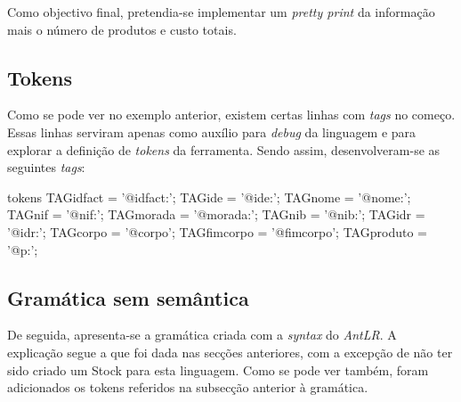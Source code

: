 \documentclass[11pt,a4paper]{article}
\begin{document}
Como objectivo final, pretendia-se implementar um \emph{pretty print} da informação mais o número de produtos e custo totais. 

\subsection{Tokens}

Como se pode ver no exemplo anterior, existem certas linhas com \emph{tags} no começo. Essas linhas serviram apenas como auxílio para \emph{debug} da 
linguagem e para explorar a definição de \emph{tokens} da ferramenta. Sendo assim, desenvolveram-se as seguintes \emph{tags}:

\begin{code_txt}
 
tokens{
	TAGidfact = '@idfact:';
	TAGide = '@ide:';
	TAGnome = '@nome:';
	TAGnif = '@nif:';
	TAGmorada = '@morada:';
	TAGnib = '@nib:';
	TAGidr = '@idr:';
	TAGcorpo = '@corpo';
	TAGfimcorpo = '@fimcorpo';
	TAGproduto = '@p:';
}

\end{code_txt}

\subsection{Gramática sem semântica}

De seguida, apresenta-se a gramática criada com a \emph{syntax} do \emph{AntLR}. A explicação segue a que foi dada nas secções anteriores, com a 
excepção de não ter sido criado um Stock para esta linguagem. Como se pode ver também, foram adicionados os tokens referidos na subsecção anterior à gramática. 
\end{document}
